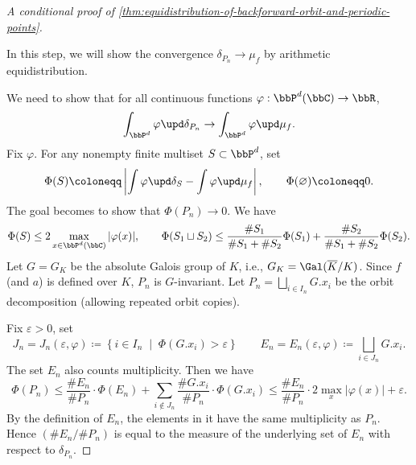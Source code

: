 \begin{proof}[A conditional proof of \cref{thm:equidistribution-of-backforward-orbit-and-periodic-points}]
	\begin{step}
		In this step, we will show the convergence $\delta_{P_n} \to \mu_f$ by arithmetic equidistribution.
	\end{step}

	We need to show that for all continuous functions $\varphi: \bbP^d(\bbC) \to \bbR$,
	\[ \int_{\bbP^d} \varphi \upd \delta_{P_n} \to \int_{\bbP^d} \varphi \upd \mu_f. \]
	Fix $\varphi$.
	For any nonempty finite multiset $S \subset \bbP^d$, set
	\[ \Phi(S) \coloneqq \left| \int \varphi \upd \delta_{S} - \int \varphi \upd \mu_f\right|,\qquad \Phi(\varnothing)\coloneqq0. \]
	The goal becomes to show that $\Phi(P_n) \to 0$.
	We have
	\[ \Phi(S) \leq 2 \max_{x \in \bbP^d(\bbC)} |\varphi(x)|, \qquad \Phi(S_1 \sqcup S_2) \leq \frac{\# S_1}{ \# S_1 + \# S_2} \Phi(S_1) + \frac{\# S_2}{ \# S_1 + \# S_2} \Phi(S_2). \]
	Let $G = G_K$ be the absolute Galois group of $K$, i.e., $G_K = \Gal(\overline{K}/K)$.
	Since $f$ (and $a$) is defined over $K$, $P_n$ is $G$-invariant.
	Let $P_n = \bigsqcup_{i \in I_n} G.x_i$ be the orbit decomposition (allowing repeated orbit copies).

	Fix $\varepsilon > 0$, set
	\[ J_n = J_n(\varepsilon,\varphi) \coloneqq \left\{ i \in I_n \;\middle|\; \Phi(G.x_i) > \varepsilon \right\} \qquad E_n = E_n(\varepsilon,\varphi) \coloneqq \bigsqcup_{i \in J_n} G.x_i . \]
	The set $E_n$ also counts multiplicity.
	Then we have
	\begin{equation}\label{eq:estimation-in-proof-of-equidistribution-by-arithmetic-equidistribution}
		\Phi(P_n) \leq \frac{\# E_n}{\# P_n} \cdot \Phi(E_n) + \sum_{i \notin J_n} \frac{\# G.x_i}{\# P_n} \cdot \Phi(G.x_i) \leq \frac{\# E_n}{\# P_n} \cdot 2 \max_{x} |\varphi(x)| + \varepsilon.
	\end{equation}
	By the definition of $E_n$, the elements in it have the same multiplicity as $P_n$.
	Hence $(\# E_n / \# P_n)$ is equal to the measure of the underlying set of $E_n$ with respect to $\delta_{P_n}$.


\end{proof}
